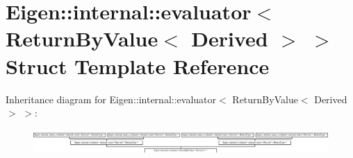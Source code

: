 \hypertarget{struct_eigen_1_1internal_1_1evaluator_3_01_return_by_value_3_01_derived_01_4_01_4}{}\section{Eigen\+:\+:internal\+:\+:evaluator$<$ Return\+By\+Value$<$ Derived $>$ $>$ Struct Template Reference}
\label{struct_eigen_1_1internal_1_1evaluator_3_01_return_by_value_3_01_derived_01_4_01_4}
Inheritance diagram for Eigen\+:\+:internal\+:\+:evaluator$<$ Return\+By\+Value$<$ Derived $>$ $>$\+:\begin{figure}[H]
\begin{center}
\leavevmode
\includegraphics[height=0.958904cm]{struct_eigen_1_1internal_1_1evaluator_3_01_return_by_value_3_01_derived_01_4_01_4}
\end{center}
\end{figure}
